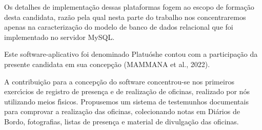 \documentclass[
12pt,		%
openright,	%
twoside,  %
a4paper,			%
chapter=TITLE,		%
english,			%
french,				%
spanish,			%
brazil				%
]{USPSC-classe/USPSC}
\begin{document}
Os detalhes de implementa\c{c}\~ao dessas plataformas fogem ao escopo de forma\c{c}\~ao desta candidata, raz\~ao pela qual nesta parte do trabalho nos concentraremos apenas na caracteriza\c{c}\~ao do modelo de banco de dados relacional que foi implementado no servidor MySQL.









Este software-aplicativo foi denominado \textquotedbl Platu\'osh\textquotedbl  e contou com a participa\c{c}\~ao da presente candidata em sua concep\c{c}\~ao  (MAMMANA et al., 2022).









A contribui\c{c}\~ao para a concep\c{c}\~ao do software concentrou-se nos primeiros exerc\'{\i}cios de registro de presen\c{c}a e de realiza\c{c}\~ao de oficinas, realizado por n\'os utilizando meios f\'{\i}sicos. Propusemos um sistema de testemunhos documentais para comprovar a realiza\c{c}\~ao das oficinas, colecionando notas em Di\'arios de Bordo, fotografias, listas de presen\c{c}a e material de divulga\c{c}\~ao das oficinas.
\end{document}

